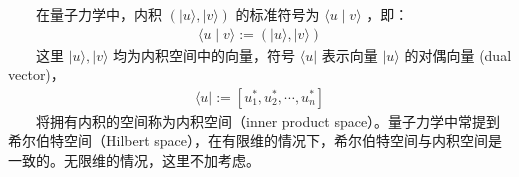 \documentclass[a4paper,11pt,english]{sphinxmanual}
\begin{document}
\sphinxAtStartPar
​  在量子力学中，内积  \((|u\rangle,|v\rangle)\) 的标准符号为  \(\langle u \mid v\rangle\) ，即：
\begin{equation*}
\begin{split}\langle u \mid v\rangle :=(|u\rangle,|v\rangle)\end{split}
\end{equation*}
\sphinxAtStartPar
​  这里  \(| {u}\rangle,| {v}\rangle\) 均为内积空间中的向量，符号  \(\langle u|\) 表示向量  \(| {u}\rangle\) 的对偶向量 (dual vector)，
\begin{equation*}
\begin{split}\langle u|:=\left[u_{1}^{*}, u_{2}^{*}, \cdots, u_{n}^{*}\right]\end{split}
\end{equation*}
\sphinxAtStartPar
​​  将拥有内积的空间称为内积空间（inner product space）。量子力学中常提到希尔伯特空间（Hilbert space），在有限维的情况下，希尔伯特空间与内积空间是一致的。无限维的情况，这里不加考虑。
\end{document}

